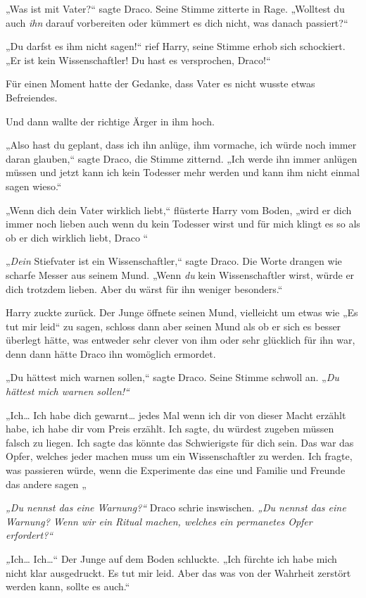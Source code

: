 {„Was ist mit Vater?“ sagte Draco. Seine Stimme zitterte in Rage. „Wolltest du auch \emph{ihn} darauf vorbereiten oder kümmert es dich nicht, was danach passiert?“

„Du darfst es ihm nicht sagen!“ rief Harry, seine Stimme erhob sich schockiert. „Er ist kein Wissenschaftler! Du hast es versprochen, Draco!“

Für einen Moment hatte der Gedanke, dass Vater es nicht wusste etwas Befreiendes.

Und dann wallte der richtige Ärger in ihm hoch.

„Also hast du geplant, dass ich ihn anlüge, ihm vormache, ich würde noch immer daran glauben,“ sagte Draco, die Stimme zitternd. „Ich werde ihn immer anlügen müssen und jetzt kann ich kein Todesser mehr werden und kann ihm nicht einmal sagen wieso.“

„Wenn dich dein Vater wirklich liebt,“ flüsterte Harry vom Boden, „wird er dich immer noch lieben auch wenn du kein Todesser wirst und für mich klingt es so als ob er dich wirklich liebt, Draco \later“

„\emph{Dein} Stiefvater ist ein Wissenschaftler,“ sagte Draco. Die Worte drangen wie scharfe Messer aus seinem Mund. „Wenn \emph{du} kein Wissenschaftler wirst, würde er dich trotzdem lieben. Aber du wärst für ihn weniger besonders.“

Harry zuckte zurück. Der Junge öffnete seinen Mund, vielleicht um etwas wie „Es tut mir leid“ zu sagen, schloss dann aber seinen Mund als ob er sich es besser überlegt hätte, was entweder sehr clever von ihm oder sehr glücklich für ihn war, denn dann hätte Draco ihn womöglich ermordet.

„Du hättest mich warnen sollen,“ sagte Draco. Seine Stimme schwoll an. „\emph{Du hättest mich warnen sollen!“}

„Ich… Ich habe dich gewarnt… jedes Mal wenn ich dir von dieser Macht erzählt habe, ich habe dir vom Preis erzählt. Ich sagte, du würdest zugeben müssen falsch zu liegen. Ich sagte das könnte das Schwierigste für dich sein. Das war das Opfer, welches jeder machen muss um ein Wissenschaftler zu werden. Ich fragte, was passieren würde, wenn die Experimente das eine und Familie und Freunde das andere sagen \later„

\emph{„Du nennst das eine Warnung?“} Draco schrie inswischen. \emph{„Du nennst das eine Warnung? Wenn wir ein Ritual machen, welches ein permanetes Opfer erfordert?“}

\emph{„}Ich… Ich…“ Der Junge auf dem Boden schluckte. „Ich fürchte ich habe mich nicht klar ausgedruckt. Es tut mir leid. Aber das was von der Wahrheit zerstört werden kann, sollte es auch.“

}
